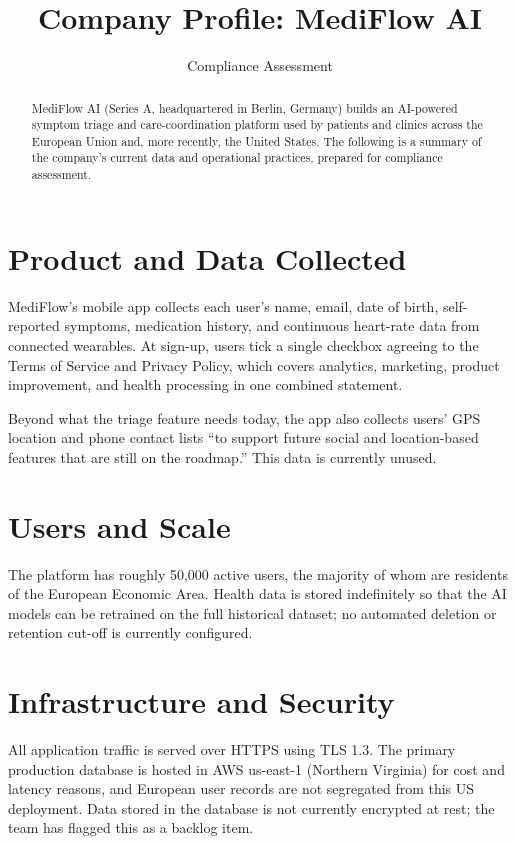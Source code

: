 \documentclass[acmsmall,nonacm]{acmart}
\begin{document}
\title{Company Profile: MediFlow AI}
\author{Compliance Assessment}
\renewcommand{\shortauthors}{MediFlow AI}
\authorsaddresses{}  %

\begin{abstract}
MediFlow AI (Series A, headquartered in Berlin, Germany) builds an AI-powered symptom
triage and care-coordination platform used by patients and clinics across the European
Union and, more recently, the United States. The following is a summary of the company's
current data and operational practices, prepared for compliance assessment.
\end{abstract}

\maketitle

\section{Product and Data Collected}
MediFlow's mobile app collects each user's name, email, date of birth, self-reported
symptoms, medication history, and continuous heart-rate data from connected wearables. At
sign-up, users tick a single checkbox agreeing to the Terms of Service and Privacy Policy,
which covers analytics, marketing, product improvement, and health processing in one
combined statement.

Beyond what the triage feature needs today, the app also collects users' GPS location and
phone contact lists ``to support future social and location-based features that are still
on the roadmap.'' This data is currently unused.

\section{Users and Scale}
The platform has roughly 50,000 active users, the majority of whom are residents of the
European Economic Area. Health data is stored indefinitely so that the AI models can be
retrained on the full historical dataset; no automated deletion or retention cut-off is
currently configured.

\section{Infrastructure and Security}
All application traffic is served over HTTPS using TLS 1.3. The primary production database
is hosted in AWS us-east-1 (Northern Virginia) for cost and latency reasons, and European
user records are not segregated from this US deployment. Data stored in the database is not
currently encrypted at rest; the team has flagged this as a backlog item.
\end{document}

